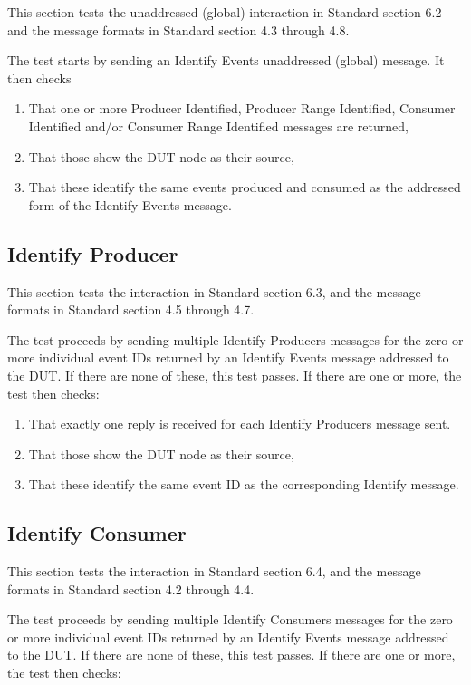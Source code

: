 \documentclass[11pt]{article}
\begin{document}
This section tests the unaddressed (global) interaction in Standard section 6.2 and
the message formats in Standard section 4.3 through 4.8.

The test starts by sending an Identify Events unaddressed (global) message.
It then checks

\begin{enumerate}
\item That one or more Producer Identified, Producer Range Identified, 
        Consumer Identified and/or Consumer Range Identified messages are returned,
\item That those show the DUT node as their source,
\item That these identify the same events produced and consumed as the 
        addressed form of the Identify Events message.
\end{enumerate}

\subsection{Identify Producer}

This section tests the interaction in Standard section 6.3, and
the message formats in Standard section 4.5 through 4.7.

The test proceeds by sending multiple Identify Producers messages for 
the zero or more individual event IDs returned by an Identify Events message 
addressed to the DUT. If there are none of these, this test passes. If there
are one or more, the test then checks:

\begin{enumerate}
\item That exactly one reply is received for each Identify Producers message sent.
\item That those show the DUT node as their source,
\item That these identify the same event ID as the corresponding Identify message.
\end{enumerate}

\subsection{Identify Consumer}

This section tests the interaction in Standard section 6.4, and
the message formats in Standard section 4.2 through 4.4.

The test proceeds by sending multiple Identify Consumers messages for 
the zero or more individual event IDs returned by an Identify Events message 
addressed to the DUT. If there are none of these, this test passes. If there
are one or more, the test then checks:
\end{document}
